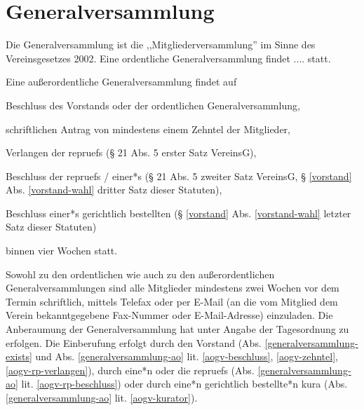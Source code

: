 \documentclass{article}
\begin{document}
\section{Generalversammlung}\label{generalversammlung}
\begin{absatz}
    \item \label{generalversammlung-exists} Die Generalversammlung ist die ,,Mitgliederversammlung'' im Sinne des Vereinsgesetzes 2002. Eine ordentliche Generalversammlung findet
    ....  statt.
    \item \label{generalversammlung-ao} Eine außerordentliche Generalversammlung findet auf
    \begin{littera}
        \item \label{aogv-beschluss} Beschluss des Vorstands oder der ordentlichen Generalversammlung,
        \item \label{aogv-zehntel} schriftlichen Antrag von mindestens einem Zehntel der Mitglieder,
        \item \label{aogv-rp-verlangen} Verlangen der \glspl{repruef} (§ 21 Abs. 5 erster Satz VereinsG),
        \item \label{aogv-rp-beschluss} Beschluss der \glspl{repruef} / einer*s  (§ 21 Abs. 5 zweiter Satz VereinsG, § \ref{vorstand} Abs. \ref{vorstand-wahl} dritter Satz dieser Statuten),
        \item \label{aogv-kurator} Beschluss einer*s gerichtlich bestellten  (§ \ref{vorstand} Abs. \ref{vorstand-wahl} letzter Satz dieser Statuten)
    \end{littera}
    binnen vier Wochen statt.
    \item Sowohl zu den ordentlichen wie auch zu den außerordentlichen Generalversammlungen sind alle Mitglieder mindestens zwei Wochen vor dem Termin schriftlich, mittels Telefax oder per E-Mail (an die vom Mitglied dem Verein bekanntgegebene Fax-Nummer oder E-Mail-Adresse) einzuladen. Die Anberaumung der Generalversammlung hat unter Angabe der Tagesordnung zu erfolgen. Die Einberufung erfolgt durch den Vorstand (Abs. \ref{generalversammlung-exists} und Abs. \ref{generalversammlung-ao} lit. \ref{aogv-beschluss}, \ref{aogv-zehntel}, \ref{aogv-rp-verlangen}), durch eine*n oder die \glspl{repruef} (Abs. \ref{generalversammlung-ao} lit. \ref{aogv-rp-beschluss}) oder durch eine*n gerichtlich bestellte*n \gls{kura} (Abs. \ref{generalversammlung-ao} lit. \ref{aogv-kurator}).

\end{absatz}
\end{document}
